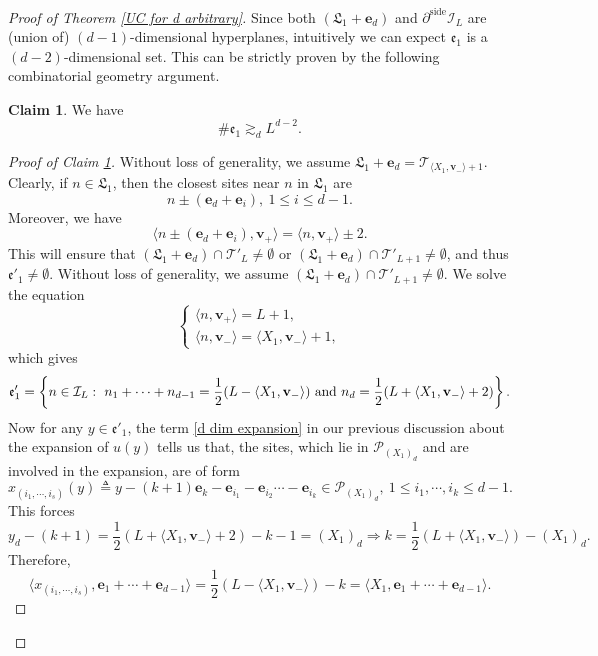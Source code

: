 \documentclass[11pt,reqno,UTF8,twoside]{amsart}
\newcommand{\bfv}{\mathbf{v}}
\newcommand{\bfe}{\mathbf{e}}
\newcommand{\mcP}{\mathcal{P}}
\newcommand{\mcI}{\mathcal{I}}
\newcommand{\mcT}{\mathcal{T}}
\newcommand{\partialside}{\partial^{\text{side}}}
\theoremstyle{definition}
\newtheorem{claim}[thm]{\bf Claim}
\numberwithin{equation}{section}
\begin{document}
\begin{proof}[Proof of Theorem \ref{UC for d arbitrary}]
Since both $(\mathfrak{L}_1+\bfe_d)$ and $\partialside \mcI_L$ are (union of) $(d-1)$-dimensional hyperplanes, intuitively we can expect $\mathfrak{e}_1$ is a $(d-2)$-dimensional set. This can be strictly proven by the following combinatorial  geometry argument.
\begin{claim}\label{number of e1}
  We have 
  \[\# \mathfrak{e}_1 \gtrsim_d L^{d-2}. \]
\end{claim}
\begin{proof}[Proof of Claim \ref{number of e1}]
  Without loss of generality, we assume $\mathfrak{L}_1+\bfe_d=\mcT_{\langle X_1,\bfv_-\rangle+1}$. Clearly, if $n\in \mathfrak{L}_1$, then the closest sites near $n$ in $\mathfrak{L}_1$ are
  \[n \pm (\bfe_d+\bfe_i),\ 1\leq i\leq d-1.\]
  Moreover, we have 
  \[ \langle n \pm (\bfe_d+\bfe_i) , \bfv_+\rangle = \langle n , \bfv_+\rangle \pm 2. \]
  This will ensure that $ (\mathfrak{L}_1+\bfe_d) \cap \mcT'_L \neq \emptyset$ or  $ (\mathfrak{L}_1+\bfe_d) \cap \mcT'_{L+1} \neq \emptyset$, and thus $\mathfrak{e}'_1\neq \emptyset$. Without loss of generality,  we assume $(\mathfrak{L}_1+\bfe_d) \cap \mcT'_{L+1} \neq \emptyset$. We solve the equation 
  \begin{equation*}
    \begin{cases}
       \langle n , \bfv_+\rangle =L +1,\\
       \langle n , \bfv_-\rangle =\langle X_1 , \bfv_-\rangle+1,
    \end{cases}
  \end{equation*}
  which gives 
  \begin{equation}\label{top set}
    \mathfrak{e}'_1= \left\{n\in \mcI_L:\  n_1+\cdots+n_{d-1}=\frac{1}{2}(L- \langle X_1 , \bfv_-\rangle) \ {\rm and} \ n_d=\frac{1}{2}(L+ \langle X_1 , \bfv_-\rangle+2) \right\}.
  \end{equation}
  Now for any $y\in \mathfrak{e}'_1$, the term \eqref{d dim expansion} in our previous discussion about the expansion of $u(y)$ tells us that, the sites, which lie in $\mcP_{(X_1)_d}$ and are involved in the expansion, are of form
  \[ x_{(i_1,\cdots,i_s)}(y)\triangleq y-(k+1)\bfe_k -\bfe_{i_1}-\bfe_{i_2}\cdots -\bfe_{i_k}  \in \mcP_{(X_1)_d},\  1\leq i_1,\cdots,i_k\leq d-1.\]
  This forces 
   \[y_d-(k+1)=\frac{1}{2}(L+ \langle X_1 , \bfv_-\rangle+2)-k-1=(X_1)_d \Rightarrow k= \frac{1}{2}(L+ \langle X_1 , \bfv_-\rangle)-(X_1 )_d. \]
  Therefore, 
  \begin{equation}\label{bottom set}
      \langle x_{(i_1,\cdots,i_s)} , \bfe_1+\cdots+\bfe_{d-1} \rangle = \frac{1}{2}(L- \langle X_1 , \bfv_-\rangle) -k = \langle X_1,\bfe_1+\cdots+\bfe_{d-1} \rangle.

\end{equation}
\end{proof}
\end{proof}
\end{document}
